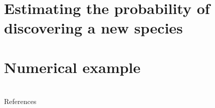 \documentclass[11pt, handout]{beamer}
\begin{document}
\section{Estimating the probability of discovering a new species}

\section{Numerical example}

\section*{}
\begin{frame}[allowframebreaks]{References} %
    \scriptsize{}
    
\end{frame}
 
\end{document}
